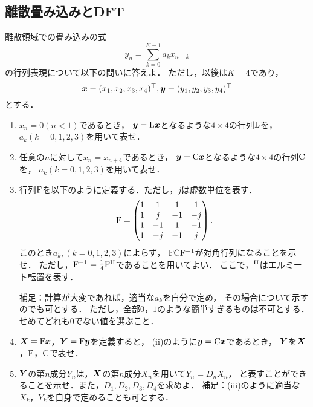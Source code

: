 \subsection{離散畳み込みとDFT}
  離散領域での畳み込みの式
  \begin{equation}
    y_n = \sum^{K-1}_{k=0} a_k x_{n-k}
  \end{equation}
  の行列表現について以下の問いに答えよ．
  ただし，以後は$K=4$であり，
  \begin{equation}
    \boldsymbol{x} = (x_1, x_2, x_3, x_4)^\top,
    \boldsymbol{y} = (y_1, y_2, y_3, y_4)^\top
  \end{equation}
  とする．
  \begin{enumerate}[label=(\roman*)]
    \item $x_n = 0 (n < 1)$であるとき，
      $\boldsymbol{y} = \mathrm{L} \boldsymbol{x}$となるような$4\times4$の行列$\mathrm{L}$を，$a_k (k=0,1,2,3)$を用いて表せ．
    \item 任意の$n$に対して$x_n=x_{n+4}$であるとき，
      $\boldsymbol{y}=\mathrm{C}\boldsymbol{x}$となるような$4\times4$の行列$\mathrm{C}$を，
      $a_k (k=0,1,2,3)$を用いて表せ．
    \item 行列$\mathrm{F}$を以下のように定義する．ただし，$j$は虚数単位を表す．
      \begin{equation}
        \mathrm{F} =
          \begin{pmatrix}
            1 &  1 &  1&  1\\
            1 &  j & -1& -j\\
            1 & -1 &  1& -1\\
            1 & -j & -1&  j
          \end{pmatrix}.
      \end{equation}
      このとき$a_k,(k=0,1,2,3)$によらず，
      $\mathrm{F}\mathrm{C}\mathrm{F}^{-1}$が対角行列になることを示せ．
      ただし，$\mathrm{F}^{-1}=\frac{1}{4}\mathrm{F}^\mathrm{H}$であることを用いてよい．
      ここで，$^\mathrm{H}$はエルミート転置を表す．

      補足：計算が大変であれば，適当な$a_k$を自分で定め，
      その場合について示すのでも可とする．
      ただし，全部$0$，$1$のような簡単すぎるものは不可とする．
      せめてどれも$0$でない値を選ぶこと．
    \item $\boldsymbol{X}=\mathrm{F}\boldsymbol{x}$，$\boldsymbol{Y}=\mathrm{F}\boldsymbol{y}$を定義すると，
      (ii)のように$\boldsymbol{y}=\mathrm{C}\boldsymbol{x}$であるとき，
      $\boldsymbol{Y}$を$\boldsymbol{X}$，$\mathrm{F}$，$\mathrm{C}$で表せ．
    \item $\boldsymbol{Y}$の第$n$成分$Y_n$は，$\boldsymbol{X}$の第$n$成分$X_n$を用いて$Y_n=D_nX_n$，
      と表すことができることを示せ．また，$D_1,D_2,D_3,D_4$を求めよ．
      補足：(iii)のように適当な$X_k$，$Y_k$を自身で定めることも可とする．
    \end{enumerate}

